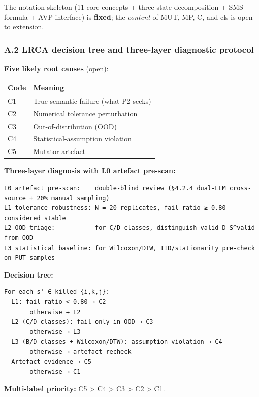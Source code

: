 \documentclass[review,12pt,authoryear]{elsarticle}
\newcounter{none}                   %
\begin{document}
The notation skeleton (11 core concepts + three-state decomposition +
SMS formula + AVP interface) is \textbf{fixed}; the \emph{content} of
MUT, MP, C, and cls is open to extension.

\subsubsection{A.2 LRCA decision tree and three-layer diagnostic
protocol}\label{a.2-lrca-decision-tree-and-three-layer-diagnostic-protocol}

\textbf{Five likely root causes} (open):

{\def\LTcaptype{none} %
\begin{longtable}[]{@{}ll@{}}
\toprule\noalign{}
Code & Meaning \\
\midrule\noalign{}
\endhead
\bottomrule\noalign{}
\endlastfoot
C1 & True semantic failure (what P2 seeks) \\
C2 & Numerical tolerance perturbation \\
C3 & Out-of-distribution (OOD) \\
C4 & Statistical-assumption violation \\
C5 & Mutator artefact \\
\end{longtable}
}

\textbf{Three-layer diagnosis with L0 artefact pre-scan:}

\begin{verbatim}
L0 artefact pre-scan:    double-blind review (§4.2.4 dual-LLM cross-source + 20% manual sampling)
L1 tolerance robustness: N = 20 replicates, fail ratio ≥ 0.80 considered stable
L2 OOD triage:           for C/D classes, distinguish valid D_S^valid from OOD
L3 statistical baseline: for Wilcoxon/DTW, IID/stationarity pre-check on PUT samples
\end{verbatim}

\textbf{Decision tree:}

\begin{verbatim}
For each s' ∈ killed_{i,k,j}:
  L1: fail ratio < 0.80 → C2
       otherwise → L2
  L2 (C/D classes): fail only in OOD → C3
       otherwise → L3
  L3 (B/D classes + Wilcoxon/DTW): assumption violation → C4
       otherwise → artefact recheck
  Artefact evidence → C5
       otherwise → C1
\end{verbatim}

\textbf{Multi-label priority:} C5 \textgreater{} C4 \textgreater{} C3
\textgreater{} C2 \textgreater{} C1.
\end{document}
